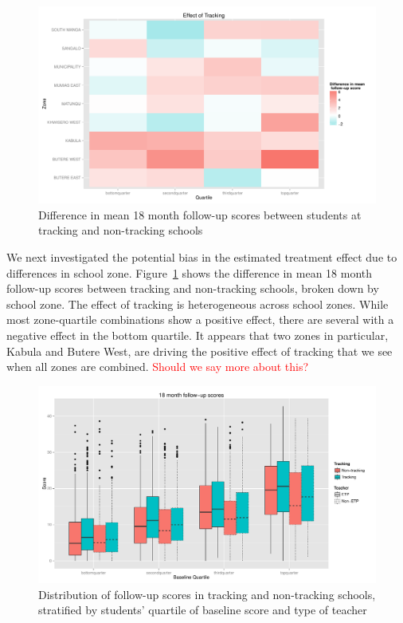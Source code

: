 \documentclass[11pt]{article}
\begin{document}
 \begin{figure}[H]
 \centering
 \includegraphics[scale=0.5]{tracking_by_zone.pdf}
 \caption{Difference in mean 18 month follow-up scores between students at tracking and non-tracking schools}
 \label{fig:stratif-zone}
 \end{figure}
 

We next investigated the potential bias in the estimated treatment effect due to differences in school zone.  Figure~\ref{fig:stratif-zone} shows the difference in mean 18 month follow-up scores between tracking and non-tracking schools, broken down by school zone.  The effect of tracking is heterogeneous across school zones.  While most zone-quartile combinations show a positive effect,  there are several with a negative effect in the bottom quartile.  It appears that two zones in particular, Kabula and Butere West, are driving the positive effect of tracking that we see when all zones are combined. \textcolor{red}{Should we say more about this?}

 
 \begin{figure}[H]
 \centering
 \includegraphics[scale=0.5]{tracking-etp-stratif.pdf}
 \caption{Distribution of follow-up scores in tracking and non-tracking schools, stratified by students' quartile of baseline score and type of teacher}
 \label{fig:tracking-etp}
 \end{figure}
 
\end{document}
